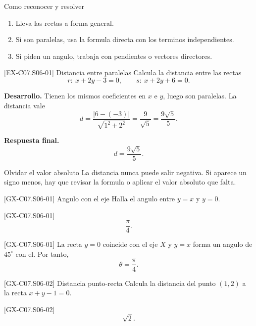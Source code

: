 \begin{methodbox}{Como reconocer y resolver}
\begin{enumerate}
  \item Lleva las rectas a forma general.
  \item Si son paralelas, usa la formula directa con los terminos independientes.
  \item Si piden un angulo, trabaja con pendientes o vectores directores.
\end{enumerate}
\end{methodbox}

\begin{solvedexample}{[EX-C07.S06-01] Distancia entre paralelas}
Calcula la distancia entre las rectas
\[
r:\ x+2y-3=0,
\qquad
s:\ x+2y+6=0.
\]

\textbf{Desarrollo.} Tienen los mismos coeficientes en \(x\) e \(y\), luego son paralelas. La
distancia vale
\[
d=\frac{|6-(-3)|}{\sqrt{1^2+2^2}}=\frac{9}{\sqrt{5}}=\frac{9\sqrt{5}}{5}.
\]

\textbf{Respuesta final.}
\[
d=\frac{9\sqrt{5}}{5}.
\]
\end{solvedexample}

\begin{commonerror}{Olvidar el valor absoluto}
La distancia nunca puede salir negativa. Si aparece un signo menos, hay que revisar la formula
o aplicar el valor absoluto que falta.
\end{commonerror}

\begin{guidedexercise}{[GX-C07.S06-01] Angulo con el eje}
Halla el angulo entre \(y=x\) y \(y=0\).
\end{guidedexercise}

\begin{shortanswer}{[GX-C07.S06-01]}
\[
\frac{\pi}{4}.
\]
\end{shortanswer}

\begin{fullsolution}{[GX-C07.S06-01]}
La recta \(y=0\) coincide con el eje \(X\) y \(y=x\) forma un angulo de \(45^\circ\) con el.
Por tanto,
\[
\theta=\frac{\pi}{4}.
\]
\end{fullsolution}

\begin{guidedexercise}{[GX-C07.S06-02] Distancia punto-recta}
Calcula la distancia del punto \((1,2)\) a la recta \(x+y-1=0\).
\end{guidedexercise}

\begin{shortanswer}{[GX-C07.S06-02]}
\[
\sqrt{2}.
\]
\end{shortanswer}

